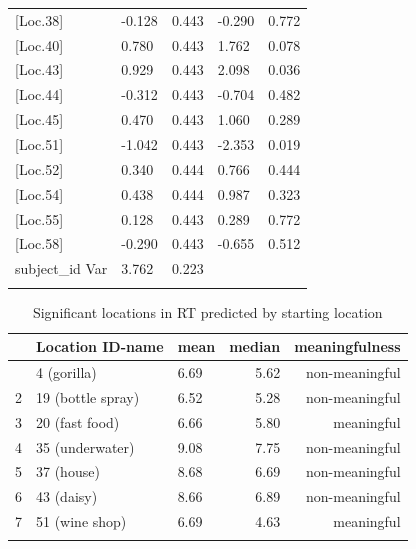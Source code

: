 \begin{longtable}{p{4cm}p{2cm}p{2cm}p{2cm}l}
	{[}Loc.38{]}    & -0.128 & 0.443 & -0.290 & 0.772 \\
	{[}Loc.40{]}    & 0.780  & 0.443 & 1.762  & 0.078 \\
	 \setrow{\bfseries} {[}Loc.43{]}    & \setrow{\bfseries}  0.929  & \setrow{\bfseries}  0.443 & \setrow{\bfseries}  2.098  & \setrow{\bfseries}  0.036   \\
	{[}Loc.44{]}    & -0.312 & 0.443 & -0.704 & 0.482 \\
	{[}Loc.45{]}    & 0.470  & 0.443 & 1.060  & 0.289 \\
	 \setrow{\bfseries} {[}Loc.51{]}    & \setrow{\bfseries} -1.042 & \setrow{\bfseries}  0.443 & \setrow{\bfseries}  -2.353 & \setrow{\bfseries}  0.019  \\
	{[}Loc.52{]}    & 0.340  & 0.444 & 0.766  & 0.444  \\
	{[}Loc.54{]}    & 0.438  & 0.444 & 0.987  & 0.323  \\
	{[}Loc.55{]}    & 0.128  & 0.443 & 0.289  & 0.772  \\
	{[}Loc.58{]}    & -0.290 & 0.443 & -0.655 & 0.512  \\
	subject\_id Var & 3.762  & 0.223 &  {}    &  {}    \\
	\hiderowcolors	\hline \hline
	\label{tab:RT_loc}
\end{longtable}

\begin{table}[h]
	\begin{center}
		\caption[Significant locations in RT predicted by starting location]{Significant locations in RT predicted by starting location}
		\vspace{10pt}
		\begin{tabular}{p{1.5cm} l l r r} 
			\hiderowcolors
			\hline \hline
			{} & \setrow{\bfseries} Location ID-name & \setrow{\bfseries} mean & \setrow{\bfseries} median & \setrow{\bfseries} meaningfulness \\ [.7ex] 
			\hline\hline
			\showrowcolors
			1 & 4 (gorilla)		& 		6.69 &  	5.62	& non-meaningful	  \\ 
			\hline
			2 & 19 (bottle spray)		& 		6.52 & 5.28	 	& non-meaningful 	  \\
			3 & 20 (fast food) 			& 6.66 &	5.80	& meaningful  \\
			4 & 35 (underwater) 	& 	9.08 & 7.75		& non-meaningful	  \\
			5 & 37 (house) 		& 		8.68 & 6.69 		& non-meaningful  \\ 
			6 & 43 (daisy)		& 		8.66 	& 6.89	& non-meaningful  \\ 
			7 & 51 (wine shop)		& 		6.69 & 4.63 & meaningful  \\ 
			[1ex]
			\hline \hline
			\hiderowcolors
		\end{tabular}
		\label{tab:sig_RT_loc}
	\end{center}
\end{table}

